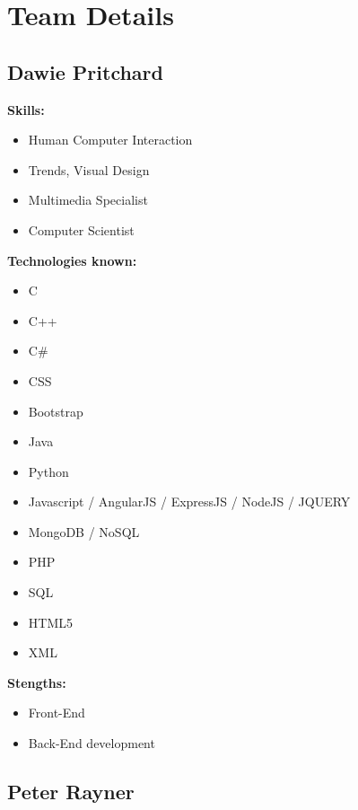 \documentclass{article}
\begin{document}
\newpage
\section{Team Details}
\subsection{Dawie Pritchard}
\textbf{Skills:}
\begin{itemize}
 	\item Human Computer Interaction
 	\item Trends, Visual Design 
 	\item Multimedia Specialist
 	\item Computer Scientist
\end {itemize}
\textbf{Technologies known:}
\begin{itemize}
	\item C
 	\item C++
 	\item C\#
 	\item CSS
 	\item Bootstrap
 	\item Java
 	\item Python
 	\item Javascript / AngularJS / ExpressJS / NodeJS / JQUERY
 	\item MongoDB / NoSQL
 	\item PHP
 	\item SQL
 	\item HTML5
 	\item XML
 \end{itemize}
\textbf{Stengths:} 
\begin{itemize}
	\item Front-End
	\item Back-End development
\end{itemize}

\newpage
\subsection {Peter Rayner}
\end{document}
